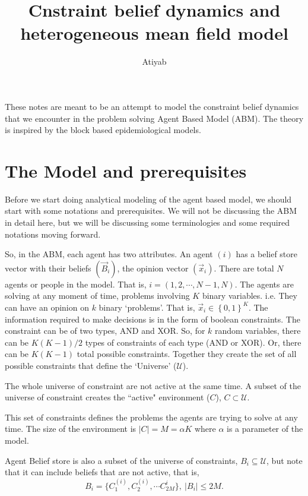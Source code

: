 \documentclass[]{article}
\title{Cnstraint belief dynamics and heterogeneous mean field model}
\author{Atiyab}
\begin{document}
\maketitle

\begin{abstract}

\end{abstract}

These notes are meant to be an attempt to model the constraint belief dynamics that we encounter in the problem solving Agent Based Model (ABM). The theory is inspired by the block based epidemiological models. 

\section{The Model and prerequisites}

Before we start doing analytical modeling of the agent based model, we should start with some notations and prerequisites. We will not be discussing the ABM in detail here, but we will be discussing some terminologies and some required notations moving forward.

So, in the ABM, each agent has two attributes. An agent $(i)$ has a belief store vector with their beliefs $(\vec{B}_i)$, the opinion vector $(\vec{x}_i)$. There are total $N$ agents or people in the model. That is, $i=\left(1,2,\cdots,N-1,N\right)$. The agents are solving at any moment of time, problems involving $K$ binary variables. i.e. They can have an opinion on $k$ binary `problems'. That is, $\vec{x}_i \in \left\{0,1\right\}^K$. The information required to make decisions is in the form of boolean constraints. The constraint can be of two types, AND and XOR. So, for $k$ random variables, there can be $K(K-1)/2$ types of constraints of each type (AND or XOR). Or, there can be $K(K-1)$ total possible constraints. Together they create the set of all possible constraints that define the `Universe' ($\mathcal{U}$). 

The whole universe of constraint are not active at the same time. A subset of the universe of constraint creates the ``active" environment ($C$), $C \subset \mathcal{U}$.

This set of constraints defines the problems the agents are trying to solve at any time. The size of the environment is $|C|=M=\alpha K$ where $\alpha$ is a parameter of the model.

Agent Belief store is also a subset of the universe of constraints, $B_i \subseteq \mathcal{U}$, but note that it can include beliefs that are not active, that is, $$B_i = \{ C_1^{(i)},C_2^{(i)} , \cdots C_{2M}^i\}, \ |B_i| \le 2M.$$ 
\end{document}
